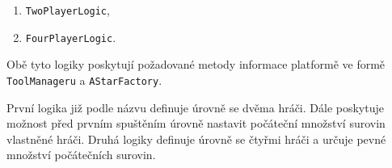 \begin{enumerate}
	\item \texttt{TwoPlayerLogic},
	\item \texttt{FourPlayerLogic}.
\end{enumerate}

Obě tyto logiky poskytují požadované metody informace platformě ve formě \texttt{ToolManageru} a \texttt{AStarFactory}. 

První logika již podle názvu definuje úrovně se dvěma hráči. Dále poskytuje možnost před prvním spuštěním úrovně nastavit počáteční množství surovin vlastněné hráči.
Druhá logiky definuje úrovně se čtyřmi hráči a určuje pevné množství počátečních surovin.

